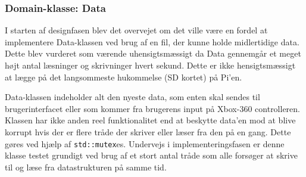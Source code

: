 \subsubsection{Domain-klasse: Data} \label{sec:data_klasse}
I starten af designfasen blev det overvejet om det ville være en fordel at implementere Data-klassen ved brug af en fil, der kunne holde midlertidige data.
Dette blev vurderet som værende uhensigtsmæssigt da Data gennemgår et meget højt antal læsninger og skrivninger hvert sekund.
Dette er ikke hensigtsmæssigt at lægge på det langsommeste hukommelse (SD kortet) på Pi'en.

Data-klassen indeholder alt den nyeste data, som enten skal sendes til brugerinterfacet eller som kommer fra brugerens input på Xbox-360 controlleren. Klassen har ikke anden reel funktionalitet end at beskytte data'en mod at blive korrupt hvis der er flere tråde der skriver eller læser fra den på en gang. Dette gøres ved hjælp af \texttt{std::mutex}es. Undervejs i implementeringsfasen er denne klasse testet grundigt ved brug af et stort antal tråde som alle forsøger at skrive til og læse fra datastrukturen på samme tid.